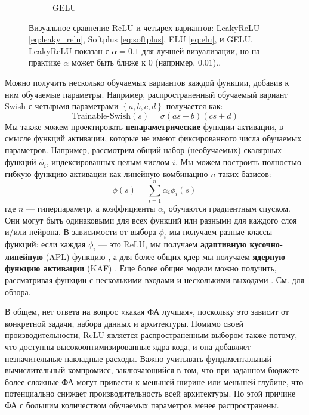 \begin{figure}[t]
\begin{subfigure}[b]{0.18\textwidth}
    \caption{GELU}
    \end{subfigure}
    \hfill
    \caption{Визуальное сравнение ReLU и четырех вариантов: LeakyReLU \eqref{eq:leaky_relu}, Softplus \eqref{eq:softplus}, ELU \eqref{eq:elu}, и GELU. LeakyReLU показан с $\alpha=0.1$ для лучшей визуализации, но на практике $\alpha$ может быть ближе к $0$ (например, $0.01$)..}
    \label{fig:activation_functions}
\end{figure}

Можно получить несколько обучаемых вариантов каждой функции, добавив к ним обучаемые параметры. Например, распространенный обучаемый вариант Swish с четырьмя параметрами $\left\{a,b,c,d\right\}$ получается как:
%
\begin{equation}
\text{Trainable-Swish}(s)=\sigma(as+b)(cs+d)
\label{eq:trainable_swish}
\end{equation}
%
Мы также можем проектировать \textbf{непараметрические} функции активации, в смысле функций активации, которые не имеют фиксированного числа обучаемых параметров. Например, рассмотрим общий набор (необучаемых) скалярных функций $\phi_i$, индексированных целым числом $i$. Мы можем построить полностью гибкую функцию активации как линейную комбинацию $n$ таких базисов:
%
\begin{equation}
\phi(s) = \sum_{i=1}^n \alpha_i \phi_i(s) \,
\label{eq:non_parametric_af}
\end{equation}
%
где $n$ — гиперпараметр, а коэффициенты $\alpha_i$ обучаются градиентным спуском. Они могут быть одинаковыми для всех функций или разными для каждого слоя и/или нейрона. В зависимости от выбора $\phi_i$ мы получаем разные классы функций: если каждая $\phi_i$ — это ReLU, мы получаем \textbf{адаптивную кусочно-линейную} (APL) функцию \cite{agostinelli2014learning}, а для более общих ядер мы получаем \textbf{ядерную функцию активации} (KAF) \cite{marra2018learning,scardapane2019kafnets}. Еще более общие модели можно получить, рассматривая функции с несколькими входами и несколькими выходами \cite{li2023generalized}. См. \cite{apicella2021survey} для обзора.

В общем, нет ответа на вопрос «какая ФА лучшая», поскольку это зависит от конкретной задачи, набора данных и архитектуры. Помимо своей производительности, ReLU является распространенным выбором также потому, что доступны высокооптимизированные ядра кода, и она добавляет незначительные накладные расходы. Важно учитывать фундаментальный вычислительный компромисс, заключающийся в том, что при заданном бюджете более сложные ФА могут привести к меньшей ширине или меньшей глубине, что потенциально снижает производительность всей архитектуры. По этой причине ФА с большим количеством обучаемых параметров менее распространены.

